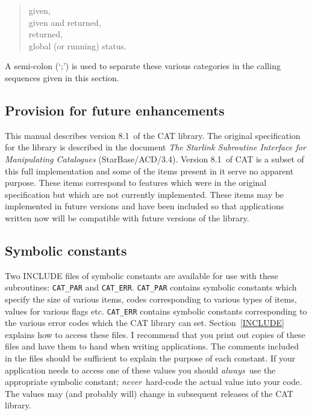 \documentclass[11pt,twoside]{starlink}
\providecommand{\CATversion}{8.1~}
\begin{document}
\begin{verse}
given,  \\
given and returned,  \\
returned,  \\
global (or running) status.
\end{verse}

A semi-colon (`;') is used to separate these various categories in the
calling sequences given in this section.


\subsection{Provision for future enhancements}

This manual describes version \CATversion of the CAT library.  The
original specification for the library is described in the document \textit{The Starlink Subroutine Interface for Manipulating Catalogues}\/
(StarBase/ACD/3.4)\cite{STARBASE34}.  Version \CATversion of CAT is a
subset of this full implementation and some of the items present in it
serve no apparent purpose.  These items correspond to features which were
in the original specification but which are not currently implemented.
These items may be implemented in future versions and have been included
so that applications written now will be compatible with future versions
of the library.

\subsection{Symbolic constants}

Two INCLUDE files of symbolic constants are available for use with these
subroutines: \texttt{CAT\_PAR} and \texttt{CAT\_ERR}. \texttt{CAT\_PAR} contains
symbolic constants which specify the size of various items, codes
corresponding to various types of items, values for various flags etc.
\texttt{CAT\_ERR} contains symbolic constants corresponding to the various
error codes which the CAT library can set. Section~\ref{INCLUDE}
explains how to access these files. I recommend that you print out
copies of these files and have them to hand when writing applications.
The comments included in the files should be sufficient to explain the
purpose of each constant. If your application needs to access one of
these values you should \textit{always}\, use the appropriate symbolic
constant; \textit{never}\, hard-code the actual value into your code.
The values may (and probably will) change in subsequent releases of
the CAT library.
\end{document}
